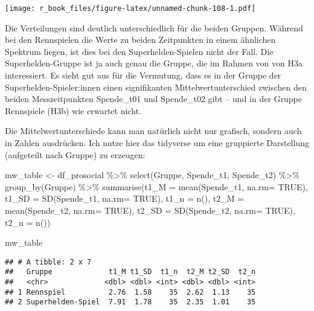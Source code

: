 \documentclass[
]{book}
\newenvironment{Shaded}{\begin{snugshade}}{\end{snugshade}}
\newcommand{\AttributeTok}[1]{\textcolor[rgb]{0.77,0.63,0.00}{#1}}
\newcommand{\ConstantTok}[1]{\textcolor[rgb]{0.00,0.00,0.00}{#1}}
\newcommand{\FunctionTok}[1]{\textcolor[rgb]{0.00,0.00,0.00}{#1}}
\newcommand{\NormalTok}[1]{#1}
\newcommand{\OtherTok}[1]{\textcolor[rgb]{0.56,0.35,0.01}{#1}}
\newcommand{\SpecialCharTok}[1]{\textcolor[rgb]{0.00,0.00,0.00}{#1}}
\begin{document}
\texttt{[image: r\_book\_files/figure-latex/unnamed-chunk-108-1.pdf]}

Die Verteilungen sind deutlich unterschiedlich für die beiden Gruppen. Während bei den Rennspielen die Werte zu beiden Zeitpunkten in einem ähnlichen Spektrum liegen, ist dies bei den Superhelden-Spielen nicht der Fall. Die Superhelden-Gruppe ist ja auch genau die Gruppe, die im Rahmen von von H3a interessiert. Es sieht gut aus für die Vermutung, dass es in der Gruppe der Superhelden-Spieler:innen einen signifikanten Mittelwertunterschied zwischen den beiden Messzeitpunkten Spende\_t01 und Spende\_t02 gibt -- und in der Gruppe Rennspiele (H3b) wie erwartet nicht.

Die Mittelwertunterschiede kann man natürlich nicht nur grafisch, sondern auch in Zahlen ausdrücken. Ich nutze hier das tidyverse um eine gruppierte Darstellung (aufgeteilt nach Gruppe) zu erzeugen:

\begin{Shaded}
\begin{Highlighting}[]
\NormalTok{mw\_table }\OtherTok{\textless{}{-}}\NormalTok{ df\_prosocial }\SpecialCharTok{\%\textgreater{}\%} 
  \FunctionTok{select}\NormalTok{(Gruppe, Spende\_t1, Spende\_t2) }\SpecialCharTok{\%\textgreater{}\%} 
  \FunctionTok{group\_by}\NormalTok{(Gruppe) }\SpecialCharTok{\%\textgreater{}\%} 
  \FunctionTok{summarise}\NormalTok{(}\AttributeTok{t1\_M =} \FunctionTok{mean}\NormalTok{(Spende\_t1, }\AttributeTok{na.rm=} \ConstantTok{TRUE}\NormalTok{),}
            \AttributeTok{t1\_SD =} \FunctionTok{SD}\NormalTok{(Spende\_t1, }\AttributeTok{na.rm=} \ConstantTok{TRUE}\NormalTok{),}
            \AttributeTok{t1\_n =} \FunctionTok{n}\NormalTok{(),}
            \AttributeTok{t2\_M =} \FunctionTok{mean}\NormalTok{(Spende\_t2, }\AttributeTok{na.rm=} \ConstantTok{TRUE}\NormalTok{),}
            \AttributeTok{t2\_SD =} \FunctionTok{SD}\NormalTok{(Spende\_t2, }\AttributeTok{na.rm=} \ConstantTok{TRUE}\NormalTok{),}
            \AttributeTok{t2\_n =} \FunctionTok{n}\NormalTok{())}

\NormalTok{mw\_table}
\end{Highlighting}
\end{Shaded}

\begin{verbatim}
## # A tibble: 2 x 7
##   Gruppe             t1_M t1_SD  t1_n  t2_M t2_SD  t2_n
##   <chr>             <dbl> <dbl> <int> <dbl> <dbl> <int>
## 1 Rennspiel          2.76  1.58    35  2.62  1.13    35
## 2 Superhelden-Spiel  7.91  1.78    35  2.35  1.01    35
\end{verbatim}
\end{document}
